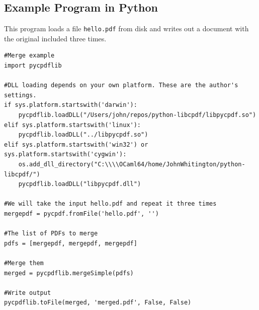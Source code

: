 \documentclass{book}
\begin{document}
\begin{pycpdflib}
\chapter*{Example Program in Python}

This program loads a file \texttt{hello.pdf} from disk and writes out a
document with the original included three times.

\begin{small}
\begin{verbatim}
#Merge example
import pycpdflib

#DLL loading depends on your own platform. These are the author's settings.
if sys.platform.startswith('darwin'):
    pycpdflib.loadDLL("/Users/john/repos/python-libcpdf/libpycpdf.so")
elif sys.platform.startswith('linux'):
    pycpdflib.loadDLL("../libpycpdf.so")
elif sys.platform.startswith('win32') or sys.platform.startswith('cygwin'):
    os.add_dll_directory("C:\\\\OCaml64/home/JohnWhitington/python-libcpdf/")
    pycpdflib.loadDLL("libpycpdf.dll")

#We will take the input hello.pdf and repeat it three times
mergepdf = pycpdf.fromFile('hello.pdf', '')

#The list of PDFs to merge
pdfs = [mergepdf, mergepdf, mergepdf]

#Merge them
merged = pycpdflib.mergeSimple(pdfs)

#Write output
pycpdflib.toFile(merged, 'merged.pdf', False, False)
\end{verbatim}
\end{small}
\end{pycpdflib}
\end{document}
